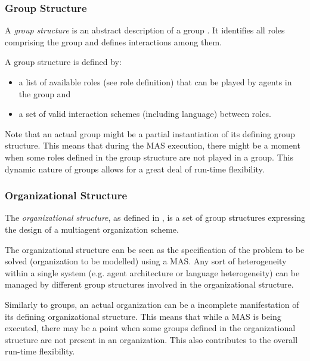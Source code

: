 \subsubsection*{Group Structure}

A \textit{group structure} is an abstract description of a group \cite{Ferber97}.
It identifies all roles comprising the group and defines interactions among them.

A group structure is defined by:
\begin{itemize}
	\item a list of available roles (see role definition) that can be played by agents in the group and
	\item a set of valid interaction schemes (including language) between roles.
\end{itemize}

Note that an actual group might be a partial instantiation of its defining group structure.
This means that during the MAS execution, there might be a moment when some roles defined in the group structure are not played in a group.
This dynamic nature of groups allows for a great deal of run-time flexibility.

\subsubsection*{Organizational Structure}

The \textit{organizational structure}, as defined in \cite{Ferber97}, is a set of group structures expressing the design of a multiagent organization scheme.

The organizational structure can be seen as the specification of the problem to be solved (organization to be modelled) using a MAS.
Any sort of heterogeneity within a single system (e.g. agent architecture or language heterogeneity) can be managed by different group structures involved in the organizational structure.

Similarly to groups, an actual organization can be a incomplete manifestation of its defining organizational structure.
This means that while a MAS is being executed, there may be a point when some groups defined in the organizational structure are not present in an organization.
This also contributes to the overall run-time flexibility.

